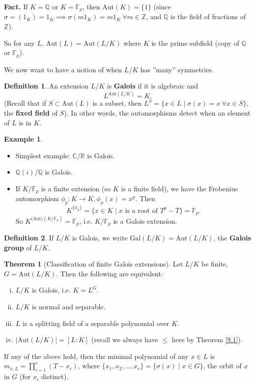 \documentclass{article}
\theoremstyle{definition}
\newtheorem{theorem}{Theorem}[section]
\newtheorem{example}{Example}[section]
\newtheorem{defn}{Definition}[section]
\begin{document}

\textbf{Fact.} If $K=\mathbb{Q}$ or $K=\mathbb{F}_p$, then $\text{Aut}(K)=\{1\}$ (since $\sigma=(1_K)=1_K \implies \sigma(m 1_K) = m 1_K ~\forall m \in \mathbb{Z}$, and $\mathbb{Q}$ is the field of fractions of $\mathbb{Z}$).

So for any $L$, $\text{Aut}(L)=\text{Aut}(L/K)$ where $K$ is the prime subfield (copy of $\mathbb{Q}$ or $\mathbb{F}_p$).
\vspace{1mm}

We now want to have a notion of when $L/K$ has ''many'' symmetries.
\begin{defn}
    An extension $L/K$ is \textbf{Galois} if it is algebraic and $$L^{\text{Aut}(L/K)}=K.$$ (Recall that if $S \subset \text{Aut}(L)$ is a subset, then $L^S = \{x \in L \mid \sigma(x)=x ~\forall x \in S\}$, the \textbf{fixed field} of $S$). In other words, the automorphisms detect when an element of $L$ is in $K$.
\end{defn}
\begin{example}
    \begin{itemize}
        \item Simplest example: $\mathbb{C}/\mathbb{R}$ is Galois. 
        \item $\mathbb{Q}(i)/\mathbb{Q}$ is Galois.
        \item If $K/\mathbb{F}_p$ is a finite extension (so $K$ is a finite field), we have the Frobenius automorphism $\phi_p : K \to K, \phi_p(x)=x^p$. Then \[
        K^{\{\phi_p\}} = \{x \in K \mid x \text{ is a root of }T^p-T\} = \mathbb{F}_p.
        \]
        So $K^{\text{(Aut)}(K/\mathbb{F}_p)} = \mathbb{F}_p$, i.e. $K/\mathbb{F}_p$ is a Galois extension.
    \end{itemize}
\end{example}
\begin{defn}
    If $L/K$ is Galois, we write $\text{Gal}(L/K) = \text{Aut}(L/K)$, the \textbf{Galois group} of $L/K$.
\end{defn}
\begin{theorem}[Classification of finite Galois extensions]\label{9.2}
    Let $L/K$ be finite, $G = \text{Aut}(L/K)$. Then the following are equivalent:
    \begin{enumerate}[(i)]
        \item $L/K$ is Galois, i.e. $K=L^G$.
        \item $L/K$ is normal and separable.
        \item $L$ is a splitting field of a separable polynomial over $K$.
        \item $|\text{Aut}(L/K)|=[L:K]$ (recall we always have $\le $ here by Theorem \ref{9.1}).
    \end{enumerate}
    If any of the above hold, then the minimal polynomial of any $x \in L$ is $m_{x,L}=\prod_{i=1}^{r} (T-x_i)$, where $\{x_1,x_2,\ldots,x_r\} = \{\sigma(x) \mid  x \in G\}$, the orbit of $x$ in $G$ (for $x_i$ distinct).
\end{theorem}
\end{document}
